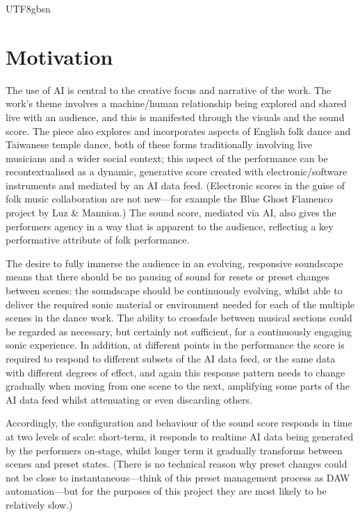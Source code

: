 \documentclass[manuscript,review,anonymous,natbib=false]{acmart}
\begin{document}
\begin{CJK*}{UTF8}{gbsn}
  \section{Motivation}

  The use of AI is central to the creative focus and narrative of the work. The work's theme involves a machine/human relationship being explored and shared live with an audience, and this is manifested through the visuals and the sound score. The piece also explores and incorporates aspects of English folk dance and Taiwanese temple dance, both of these forms traditionally involving live musicians and a wider social context; this aspect of the performance can be recontextualised as a dynamic, generative score created with electronic/software instruments and mediated by an AI data feed. (Electronic scores in the guise of folk music collaboration are not new---for example the Blue Ghost Flamenco project by Luz \& Mannion\cite{noauthor_blue_nodate}.) The sound score, mediated via AI, also gives the performers agency in a way that is apparent to the audience, reflecting a key performative attribute of folk performance.

  The desire to fully immerse the audience in an evolving, responsive soundscape means that there should be no pausing of sound for resets or preset changes between scenes: the soundscape should be continuously evolving, whilst able to deliver the required sonic material or environment needed for each of the multiple scenes in the dance work. The ability to crossfade between musical sections could be regarded as necessary, but certainly not sufficient, for a continuously engaging sonic experience. In addition, at different points in the performance the score is required to respond to different subsets of the AI data feed, or the same data with different degrees of effect, and again this response pattern needs to change gradually when moving from one scene to the next, amplifying some parts of the AI data feed whilst attenuating or even discarding others.

  Accordingly, the configuration and behaviour of the sound score responds in time at two levels of scale: short-term, it responds to realtime AI data being generated by the performers on-stage, whilst longer term it gradually transforms between scenes and preset states. (There is no technical reason why preset changes could not be close to instantaneous---think of this preset management process as DAW automation\cite{shimazu_what_2023}---but for the purposes of this project they are most likely to be relatively slow.)


\end{CJK*}
\end{document}
